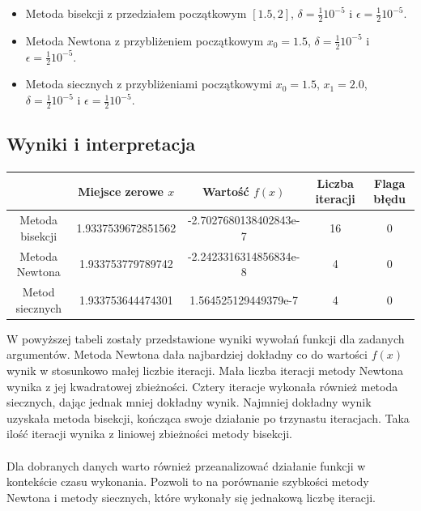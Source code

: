 \documentclass[a4paper]{article}
\begin{document}
\begin{center}
\begin{itemize}
\item	Metoda bisekcji z przedziałem początkowym $[1.5, 2]$, $\delta = \frac{1}{2}10^{-5}$ i $\epsilon = \frac{1}{2}10^{-5}$.
\item	Metoda Newtona z przybliżeniem początkowym $x_{0} = 1.5$, $\delta = \frac{1}{2}10^{-5}$ i $\epsilon = \frac{1}{2}10^{-5}$.
\item	Metoda siecznych z przybliżeniami początkowymi $x_{0} = 1.5$, $x_{1} = 2.0$, $\delta = \frac{1}{2}10^{-5}$ i $\epsilon = \frac{1}{2}10^{-5}$.
\end{itemize}
\end{center}

\subsection{Wyniki i interpretacja}
\paragraph{}

\begin{center}
 \begin{tabular}{ |c | c | c | c | c|  }
 \hline
   & Miejsce zerowe $x$ & Wartość $f(x)$ & Liczba iteracji & Flaga błędu\\
 \hline
 Metoda bisekcji & 1.9337539672851562 & -2.7027680138402843e-7 & 16 & 0 \\
 Metoda Newtona & 1.933753779789742 & -2.2423316314856834e-8 & 4 & 0 \\
 Metod siecznych & 1.933753644474301 & 1.564525129449379e-7 & 4 & 0 \\ 
 \hline
\end{tabular}
\end{center}

W powyższej tabeli zostały przedstawione wyniki wywołań funkcji dla zadanych argumentów. Metoda Newtona dała najbardziej dokładny co do wartości $f(x)$ wynik w stosunkowo małej liczbie iteracji. Mała liczba iteracji metody Newtona wynika z jej kwadratowej zbieżności. Cztery iteracje wykonała również metoda siecznych, dając jednak mniej dokładny wynik. Najmniej dokładny wynik uzyskała metoda bisekcji, kończąca swoje działanie po trzynastu iteracjach. Taka ilość iteracji wynika z liniowej zbieżności metody bisekcji.

\paragraph{}
Dla dobranych danych warto również przeanalizować działanie funkcji w kontekście czasu wykonania. Pozwoli to na porównanie szybkości metody Newtona i metody siecznych, które wykonały się jednakową liczbę iteracji. 
\end{document}

